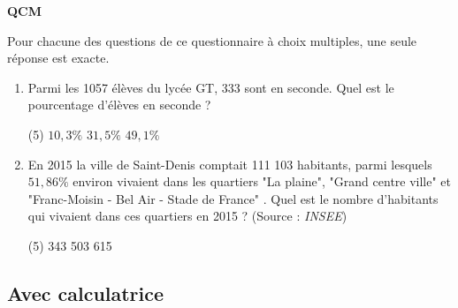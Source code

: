 \documentclass[10pt,a4paper]{article}
\begin{document}
\begin{exo}
\textbf{QCM}

\medskip

Pour chacune des questions de ce questionnaire à choix multiples, une seule réponse est exacte.
\medskip
\begin{enumerate}

   
    \item Parmi les 1057 élèves du lycée GT, 333 sont en seconde. Quel est le pourcentage d'élèves en seconde ?
    \begin{tasks}(5)
        \task $10,3\%$
        \task $31,5\%$
        \task $49,1\%$
    \end{tasks}

    \item En 2015 la ville de Saint-Denis comptait 111 103 habitants, parmi lesquels $51,86\%$ environ vivaient dans les quartiers "La plaine", "Grand centre ville" et "Franc-Moisin - Bel Air - Stade de France" . Quel est le nombre d'habitants qui vivaient dans ces quartiers en 2015 ? (Source : \textit{INSEE})
    \begin{tasks}(5)
         343
         503
         615
    \end{tasks}

\end{enumerate}
\end{exo}


\subsection{Avec calculatrice}
\end{document}
